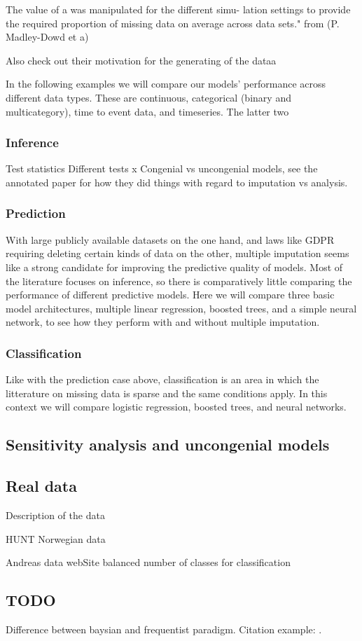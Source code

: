 \documentclass{article}
\begin{document}
	The value of a was manipulated for the different simu-
	lation settings to provide the required proportion of missing
	data on average across data sets." from (P. Madley-Dowd et a)
	
	Also check out their motivation for the generating of the dataa
	
	
	In the following examples we will compare our models' performance across different data types. These are continuous, categorical (binary and multicategory), time to event data, and timeseries. The latter two 
	
	\subsubsection{Inference}
	Test statistics
	Different tests
	x
	Congenial vs uncongenial models, see the annotated paper for how they did things with regard to imputation vs analysis. 
	
	\subsubsection{Prediction}
	With large publicly available datasets on the one hand, and laws like GDPR requiring deleting certain kinds of data on the other, multiple imputation seems like a strong candidate for improving the predictive quality of models. Most of the literature focuses on inference, so there is comparatively little comparing the performance of different predictive models. Here we will compare three basic model architectures, multiple linear regression, boosted trees, and a simple neural network, to see how they perform with and without multiple imputation.
	
	
	
	
	\subsubsection{Classification}
	Like with the prediction case above, classification is an area in which the litterature on missing data is sparse and the same conditions apply. In this context we will compare logistic regression, boosted trees, and neural networks.
	
	
	\subsection{Sensitivity analysis and uncongenial models}
	
	\subsection{Real data}
	
	Description of the data
	
	HUNT Norwegian data
	
	Andreas data webSite
	balanced number of classes for classification
	
	
	\subsection{TODO}
	Difference between baysian and frequentist paradigm.
	Citation example:
	\cite[P.10]{grund_pooling_2016}.

		
	
	
\end{document}
